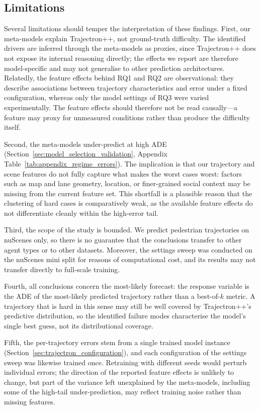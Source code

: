 \documentclass[12pt]{article}
\begin{document}
\subsection{Limitations}

Several limitations should temper the interpretation of these findings. First, our meta-models explain Trajectron++, not ground-truth difficulty. The identified drivers are inferred through the meta-models as proxies, since Trajectron++ does not expose its internal reasoning directly; the effects we report are therefore model-specific and may not generalise to other prediction architectures. Relatedly, the feature effects behind RQ1 and RQ2 are observational: they describe associations between trajectory characteristics and error under a fixed configuration, whereas only the model settings of RQ3 were varied experimentally. The feature effects should therefore not be read causally---a feature may proxy for unmeasured conditions rather than produce the difficulty itself.

Second, the meta-models under-predict at high ADE (Section~\ref{sec:model_selection_validation}, Appendix Table~\ref{tab:appendix_regime_errors}). The implication is that our trajectory and scene features do not fully capture what makes the worst cases worst: factors such as map and lane geometry, location, or finer-grained social context may be missing from the current feature set. This shortfall is a plausible reason that the clustering of hard cases is comparatively weak, as the available feature effects do not differentiate cleanly within the high-error tail.

Third, the scope of the study is bounded. We predict pedestrian trajectories on nuScenes only, so there is no guarantee that the conclusions transfer to other agent types or to other datasets. Moreover, the settings sweep was conducted on the nuScenes mini split for reasons of computational cost, and its results may not transfer directly to full-scale training.

Fourth, all conclusions concern the most-likely forecast: the response variable is the ADE of the most-likely predicted trajectory rather than a best-of-$k$ metric. A trajectory that is hard in this sense may still be well covered by Trajectron++'s predictive distribution, so the identified failure modes characterise the model's single best guess, not its distributional coverage.

Fifth, the per-trajectory errors stem from a single trained model instance (Section~\ref{sec:trajectron_configuration}), and each configuration of the settings sweep was likewise trained once. Retraining with different seeds would perturb individual errors; the direction of the reported feature effects is unlikely to change, but part of the variance left unexplained by the meta-models, including some of the high-tail under-prediction, may reflect training noise rather than missing features.
\end{document}
